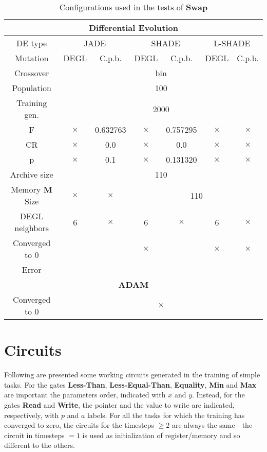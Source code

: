 \begin{table}[!h]
\begin{tabular}{|c|c|c|c|c|c|c|}
		\multicolumn{7}{|c|}{\textbf{Differential Evolution}} \\ \hline
		DE type & \multicolumn{2}{c|}{JADE} & \multicolumn{2}{c|}{SHADE} & \multicolumn{2}{c|}{L-SHADE}  \\ \hline
		Mutation & DEGL & C.p.b. & DEGL & C.p.b. & DEGL & C.p.b. \\ \hline
		Crossover & \multicolumn{6}{c|}{bin} \\ \hline
		Population & \multicolumn{6}{c|}{100} \\ \hline
		Training gen. & \multicolumn{6}{c|}{2000} \\ \hline
		F & $\times$ & 0.632763 & $\times$ & 0.757295 & $\times$ & $\times$ \\ \hline
		CR & $\times$ & 0.0 & $\times$ & 0.0 & $\times$ & $\times$ \\ \hline
		p & $\times$ & 0.1 & $\times$ & 0.131320 & $\times$ & $\times$ \\ \hline
		Archive size & \multicolumn{6}{c|}{110} \\ \hline
		Memory \textbf{M} Size & $\times$ & $\times$ & \multicolumn{4}{c|}{110} \\ \hline
		DEGL neighbors & 6 & $\times$ & 6 & $\times$ & 6 & $\times$  \\ \hline
		Converged to 0 & \checkmark & \checkmark & $\times$ & \checkmark & $\times$ & $\times$ \\ \hline
		Error & & & & & & \\ \hline\hline
		
		\multicolumn{7}{|c|}{\textbf{ADAM}} \\ \hline
		Converged to 0 & \multicolumn{6}{|c|}{$\times$} \\ \hline
 	\end{tabular}
	\caption{Configurations used in the tests of \textbf{Swap}}
	\label{tbl:tests-configurations-swap}
\end{table}

\section{Circuits}\label{subsec:circuits}
Following are presented some working circuits generated in the training of simple tasks. For the gates \textbf{Less-Than}, \textbf{Less-Equal-Than}, \textbf{Equality}, \textbf{Min} and \textbf{Max} are important the parameters order, indicated with $x$ and $y$. Instead, for the gates \textbf{Read} and \textbf{Write}, the pointer and the value to write are indicated, respectively, with $p$ and $a$ labels.\newline\newline
For all the tasks for which the training has converged to zero, the circuits for the timesteps $\geq 2$ are always the same - the circuit in timesteps $=1$ is used as initialization of register/memory and so different to the others.

